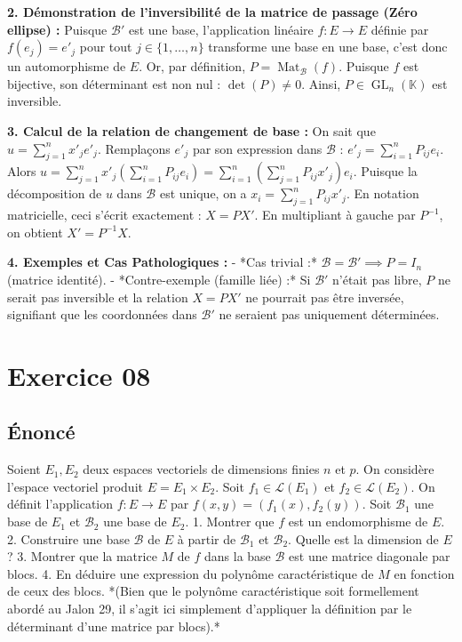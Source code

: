 \documentclass{report}
\begin{document}
\textbf{2. Démonstration de l'inversibilité de la matrice de passage (Zéro ellipse) :}
Puisque $\mathcal{B}'$ est une base, l'application linéaire $f : E \to E$ définie par $f(e_j) = e'_j$ pour tout $j \in \{1, \dots, n\}$ transforme une base en une base, c'est donc un automorphisme de $E$.
Or, par définition, $P = \operatorname{Mat}_{\mathcal{B}}(f)$.
Puisque $f$ est bijective, son déterminant est non nul : $\det(P) \neq 0$.
Ainsi, $P \in \operatorname{GL}_n(\mathbb{K})$ est inversible.

\textbf{3. Calcul de la relation de changement de base :}
On sait que $u = \sum_{j=1}^n x'_j e'_j$.
Remplaçons $e'_j$ par son expression dans $\mathcal{B}$ : $e'_j = \sum_{i=1}^n P_{ij} e_i$.
Alors $u = \sum_{j=1}^n x'_j \left( \sum_{i=1}^n P_{ij} e_i \right) = \sum_{i=1}^n \left( \sum_{j=1}^n P_{ij} x'_j \right) e_i$.
Puisque la décomposition de $u$ dans $\mathcal{B}$ est unique, on a $x_i = \sum_{j=1}^n P_{ij} x'_j$.
En notation matricielle, ceci s'écrit exactement : $X = P X'$.
En multipliant à gauche par $P^{-1}$, on obtient $X' = P^{-1} X$.

\textbf{4. Exemples et Cas Pathologiques :}
- *Cas trivial :* $\mathcal{B} = \mathcal{B}' \implies P = I_n$ (matrice identité).
- *Contre-exemple (famille liée) :* Si $\mathcal{B}'$ n'était pas libre, $P$ ne serait pas inversible et la relation $X = P X'$ ne pourrait pas être inversée, signifiant que les coordonnées dans $\mathcal{B}'$ ne seraient pas uniquement déterminées.


\section*{Exercice 08}
\subsection*{Énoncé}
Soient $E_1, E_2$ deux espaces vectoriels de dimensions finies $n$ et $p$. On considère l'espace vectoriel produit $E = E_1 \times E_2$.
Soit $f_1 \in \mathcal{L}(E_1)$ et $f_2 \in \mathcal{L}(E_2)$.
On définit l'application $f : E \to E$ par $f(x,y) = (f_1(x), f_2(y))$.
Soit $\mathcal{B}_1$ une base de $E_1$ et $\mathcal{B}_2$ une base de $E_2$.
1. Montrer que $f$ est un endomorphisme de $E$.
2. Construire une base $\mathcal{B}$ de $E$ à partir de $\mathcal{B}_1$ et $\mathcal{B}_2$. Quelle est la dimension de $E$ ?
3. Montrer que la matrice $M$ de $f$ dans la base $\mathcal{B}$ est une matrice diagonale par blocs.
4. En déduire une expression du polynôme caractéristique de $M$ en fonction de ceux des blocs. *(Bien que le polynôme caractéristique soit formellement abordé au Jalon 29, il s'agit ici simplement d'appliquer la définition par le déterminant d'une matrice par blocs).*
\end{document}

